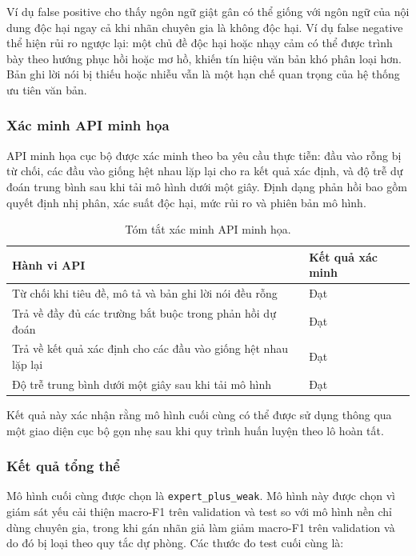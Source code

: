 Ví dụ false positive cho thấy ngôn ngữ giật gân có thể giống với ngôn ngữ của nội dung độc hại ngay cả khi nhãn chuyên gia là không độc hại. Ví dụ false negative thể hiện rủi ro ngược lại: một chủ đề độc hại hoặc nhạy cảm có thể được trình bày theo hướng phục hồi hoặc mơ hồ, khiến tín hiệu văn bản khó phân loại hơn. Bản ghi lời nói bị thiếu hoặc nhiễu vẫn là một hạn chế quan trọng của hệ thống ưu tiên văn bản.

\subsubsection{Xác minh API minh họa}

API minh họa cục bộ được xác minh theo ba yêu cầu thực tiễn: đầu vào rỗng bị từ chối, các đầu vào giống hệt nhau lặp lại cho ra kết quả xác định, và độ trễ dự đoán trung bình sau khi tải mô hình dưới một giây. Định dạng phản hồi bao gồm quyết định nhị phân, xác suất độc hại, mức rủi ro và phiên bản mô hình.

\begin{table}[H]
\centering
\small
\renewcommand{\arraystretch}{1.25}
\begin{tabularx}{\textwidth}{|>{\raggedright\arraybackslash}p{4.5cm}|>{\raggedright\arraybackslash}X|}
\hline
\textbf{Hành vi API} & \textbf{Kết quả xác minh} \\
\hline
Từ chối khi tiêu đề, mô tả và bản ghi lời nói đều rỗng & Đạt \\
\hline
Trả về đầy đủ các trường bắt buộc trong phản hồi dự đoán & Đạt \\
\hline
Trả về kết quả xác định cho các đầu vào giống hệt nhau lặp lại & Đạt \\
\hline
Độ trễ trung bình dưới một giây sau khi tải mô hình & Đạt \\
\hline
\end{tabularx}
\caption{Tóm tắt xác minh API minh họa.}
\label{tab:implementation-api-verification}
\end{table}

Kết quả này xác nhận rằng mô hình cuối cùng có thể được sử dụng thông qua một giao diện cục bộ gọn nhẹ sau khi quy trình huấn luyện theo lô hoàn tất.

\subsubsection{Kết quả tổng thể}

Mô hình cuối cùng được chọn là \texttt{expert\_plus\_weak}. Mô hình này được chọn vì giám sát yếu cải thiện macro-F1 trên validation và test so với mô hình nền chỉ dùng chuyên gia, trong khi gán nhãn giả làm giảm macro-F1 trên validation và do đó bị loại theo quy tắc dự phòng. Các thước đo test cuối cùng là:

